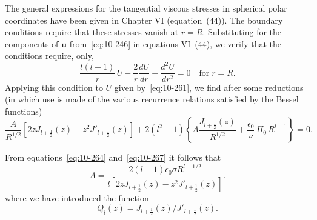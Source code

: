 The general expressions for the tangential viscous stresses in spherical polar coordinates have been given in Chapter VI (equation~(44)). The boundary conditions require that these stresses vanish at $r = R$. Substituting for the components of $\mathbf{u}$ from~\eqref{eq:10-246} in equations VI~(44), we verify that the conditions require, only,
\begin{equation}
\label{eq:10-266}
\frac{l(l+1)}{r}\,U - \frac{2}{r}\frac{dU}{dr}+\frac{d^2U}{dr^2} = 0 \quad\text{for}\;r = R.
\end{equation}
Applying this condition to $U$ given by~\eqref{eq:10-261}, we find after some reductions (in which use is made of the various recurrence relations satisfied by the Bessel functions)
\begin{equation}
\label{eq:10-267}
\frac{A}{R^{1/2}}\!\left[2zJ_{l+\frac{1}{2}}(z)-z^2J'_{l+\frac{1}{2}}(z)\right]+2(l^2-1)\!\left\{A\frac{J_{l+\frac{1}{2}}(z)}{R^{1/2}}+\frac{\epsilon_0}{\nu}\,\Pi_0\,R^{l-1}\right\} = 0.
\end{equation}

From equations~\eqref{eq:10-264} and~\eqref{eq:10-267} it follows that
\begin{equation}
\label{eq:10-268}
A = \frac{2(l-1)\epsilon_0\sigma R^{l+1/2}}{l[2zJ_{l+\frac{1}{2}}(z)-z^2J'_{l+\frac{1}{2}}(z)]}.
\end{equation}
where we have introduced the function
\begin{equation}
\label{eq:10-270}
Q_l(z) = J_{l+\frac{1}{2}}(z)/J'_{l+\frac{1}{2}}(z).
\end{equation}

